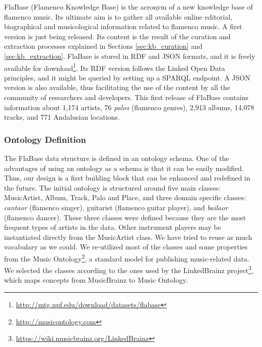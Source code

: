 FlaBase (Flamenco Knowledge Base) is the acronym of a new knowledge base of flamenco music. Its ultimate aim is to gather all available online editorial, biographical and musicological information related to flamenco music. A first version is just being released. Its content is the result of the curation and extraction processes explained in Sections \ref{sec:kb_curation} and \ref{sec:kb_extraction}. FlaBase is stored in RDF and JSON formats, and it is freely available for download\footnote{\url{http://mtg.upf.edu/download/datasets/flabase}}. Its RDF version follows the Linked Open Data principles, and it might be queried by setting up a SPARQL endpoint. A JSON version is also available, thus facilitating the use of the content by all the community of researchers and developers. This first release of FlaBase contains information about 1,174 artists, 76 \textit{palos} (flamenco genres), 2,913 albums, 14,078 tracks, and 771 Andalusian locations.


\subsubsection{Ontology Definition}\label{sec:ontology}

The FlaBase data structure is defined in an ontology schema. One of the advantages of using an ontology as a schema is that it can be easily modified. Thus, our design is a first building block that can be enhanced and redefined in the future. The initial ontology is structured around five main classes: MusicArtist, Album, Track, Palo and Place, and three domain specific classes: \textit{cantaor} (flamenco singer), guitarist (flamenco guitar player), and \textit{bailaor} (flamenco dancer). These three classes were defined because they are the most frequent types of artists in the data. Other instrument players may be instantiated directly from the MusicArtist class. 
We have tried to reuse as much vocabulary as we could. We re-utilized most of the classes and some properties from the Music Ontology\footnote{\url{http://musicontology.com}}, a standard model for publishing music-related data. We selected the classes according to the ones used by the LinkedBrainz project\footnote{\url{https://wiki.musicbrainz.org/LinkedBrainz}}, which maps concepts from MusicBrainz to Music Ontology.

